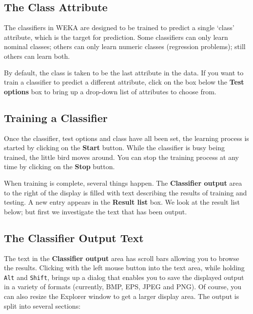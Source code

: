 \documentclass[a4paper]{article}
\begin{document}
\subsection{The Class Attribute}

The classifiers in WEKA are designed to be trained to predict a single `class'
attribute, which is the target for prediction. Some classifiers can only learn
nominal classes; others can only learn numeric classes (regression problems);
still others can learn both.

By default, the class is taken to be the last attribute in the data.  If you
want to train a classifier to predict a different attribute, click on the box
below the \textbf{Test options} box to bring up a drop-down list of attributes
to choose from.

\subsection{Training a Classifier}

Once the classifier, test options and class have all been set, the learning
process is started by clicking on the \textbf{Start} button. While the
classifier is busy being trained, the little bird moves around. You can stop
the training process at any time by clicking on the \textbf{Stop} button.

When training is complete, several things happen. The \textbf{Classifier
output} area to the right of the display is filled with text describing the
results of training and testing. A new entry appears in the \textbf{Result
list} box. We look at the result list below; but first we investigate the text
that has been output.

\subsection{The Classifier Output Text}

The text in the \textbf{Classifier output} area has scroll bars allowing you to
browse the results. Clicking with the left mouse button into the text area, 
while holding \texttt{Alt} and \texttt{Shift}, brings up a dialog that enables 
you to save the displayed output in a variety of formats (currently, BMP, EPS, JPEG and PNG). 
Of course, you can also resize the Explorer window to get a larger display area.  
The output is split into several sections:
\end{document}
